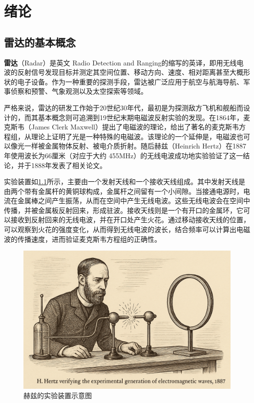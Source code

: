 \chapter{绪论}
\label{chp1}

\section{雷达的基本概念}
\textbf{雷达}（Radar）是英文 Radio Detection and Ranging的缩写的英译，即用无线电波的反射信号发现目标并测定其空间位置、移动方向、速度、相对距离甚至大概形状的电子设备。作为一种重要的探测手段，雷达被广泛应用于航空与航海导航、军事侦察和预警、气象观测以及太空探索等领域。

严格来说，雷达的研发工作始于20世纪30年代，最初是为探测敌方飞机和舰船而设计的，而其基本概念则可追溯到19世纪末期电磁波反射实验的发现。在1864年，麦克斯韦（James Clerk Maxwell）提出了电磁波的理论，给出了著名的麦克斯韦方程组，从理论上证明了光是一种特殊的电磁波。该理论的一个延伸是，电磁波也可以像光一样被金属物体反射、被电介质折射。随后赫兹（Heinrich Hertz）在1887年使用波长为66厘米（对应于大约 455MHz）的无线电波成功地实验验证了这一结论，并于1888年发表了相关论文。

实验装置如\cref{fig_chp1_hertz}所示，主要由一个发射天线和一个接收天线组成。其中发射天线是由两个带有金属杆的黄铜球构成，金属杆之间留有一个小间隙。当接通电源时，电流在金属棒之间产生振荡，从而在空间中产生无线电波。这些无线电波会在空间中传播，并被金属板反射回来，形成驻波。接收天线则是一个有开口的金属环，它可以接收到反射回来的无线电波，并在开口处产生火花。通过移动接收天线的位置，可以观察到火花的强度变化，从而得到无线电波的波长，结合频率可以计算出电磁波的传播速度，进而验证麦克斯韦方程组的正确性。

\begin{figure}[htb!]
    \centering
    \includegraphics[width=.6\textwidth]{./img/intro/hertz_experiment.png}
    \caption{赫兹的实验装置示意图}
    \label{fig_chp1_hertz}
\end{figure}

